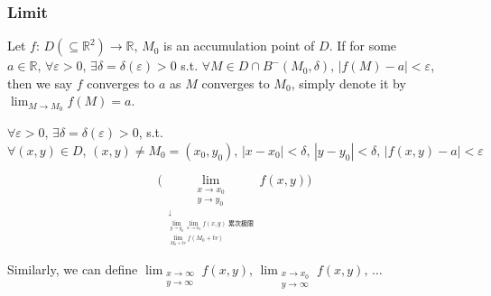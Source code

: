 \subsubsection[多变量函数的极限]{Limit}
\begin{definition}[Limit]
    Let $f:\,D\left(\subseteq\mathbb{R}^2\right)\to\mathbb{R}$, $M_0$ is an accumulation point of $D$. If for some $a\in\mathbb{R},\,\forall\varepsilon>0,\,\exists\delta=\delta(\varepsilon)>0$ s.t. $\forall M\in D\cap B^-\left(M_0,\delta\right),\,\left|f(M)-a\right|<\varepsilon$, then we say $f$ converges to $a$ as $M$ converges to $M_0$, simply denote it by $\lim_{M\to M_0}f(M)=a$.
\end{definition}

$\forall\varepsilon>0,\,\exists\delta=\delta(\varepsilon)>0$, s.t. $\forall(x,y)\in D,\,(x,y)\neq M_0=\left(x_0,y_0\right),\,\left|x-x_0\right|<\delta,\,\left|y-y_0\right|<\delta,\,\left|f(x,y)-a\right|<\varepsilon$

$$
    \text{(}\lim_{
        \underset{\substack{\downarrow\\\lim_{y\to y_0}\lim_{x\to x_0}f(x,y)\text{ 累次极限}\\\lim_{M_0+tv}f\left(M_0+tv\right)}}{\substack{x\to x_0\\y\to y_0}}}f(x,y)\text{)}
$$

Similarly, we can define $\lim_{\substack{x\to\infty\\y\to\infty}}f(x,y),\,\lim_{\substack{x\to x_0\\y\to\infty}}f(x,y),\,\dots$

